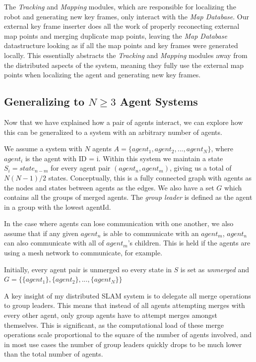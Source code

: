 The \textit{Tracking} and \textit{Mapping} modules, which are responsible for localizing the robot and generating new key frames, only interact with the \textit{Map Database}. Our external key frame inserter does all the work of properly reconecting external map points and merging duplicate map points, leaving the \textit{Map Database} datastructure looking as if all the map points and key frames were generated locally. This essentially abstracts the \textit{Tracking} and \textit{Mapping} modules away from the distributed aspects of the system, meaning they fully use the external map points when localizing the agent and generating new key frames.

\subsection{Generalizing to $N \geq 3$ Agent Systems}
\label{sec:generalizing-to-n-geq-3-agent-systems}
Now that we have explained how a pair of agents interact, we can explore how this can be generalized to a system with an arbitrary number of agents.

We assume a system with $N$ agents $A=\{agent_1, agent_2, ..., agent_N\}$, where $agent_i$ is the agent with ID = i. Within this system we maintain a state $S_i=state_{n-m}$ for every agent pair $(agent_n, agent_m)$, giving us a total of $N(N-1)/2$ states. Conceptually, this is a fully connected graph with agents as the nodes and states between agents as the edges. We also have a set $G$ which contains all the groups of merged agents. The \textit{group leader} is defined as the agent in a group with the lowest agentId.

In the case where agents can lose communication with one another, we also assume that if any given $agent_n$ is able to communicate with an $agent_m$, $agent_n$ can also communicate with all of $agent_m$'s children. This is held if the agents are using a mesh network to communicate, for example.

Initially, every agent pair is unmerged so every state in $S$ is set as \textit{unmerged} and $G=\{\{agent_1\}, \{agent_2\}, ..., \{agent_N\}\}$

A key insight of my distributed SLAM system is to delegate all merge operations to group leaders. This means that instead of all agents attempting merges with every other agent, only group agents have to attempt merges amongst themselves. This is significant, as the computational load of these merge operations scale proportional to the square of the number of agents involved, and in most use cases the number of group leaders quickly drops to be much lower than the total number of agents.

